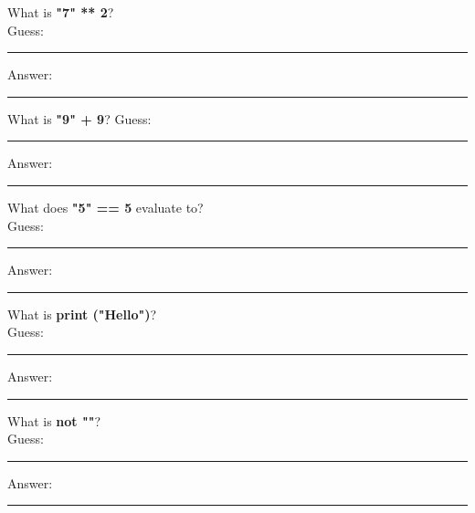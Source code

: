 \documentclass{article}
\begin{document}
\begin{tasks}[
    style=enumerate,
    label-format=\bfseries,
    label-width=1.5em,
    item-indent=2em,
    column-sep=1em,
    after-item-skip=2em
  ]
        \task What is \textbf{"7" ** 2}?  \\
        Guess:  \vspace{3mm}\\
        \rule{\linewidth}{0.4pt} %
        Answer:  \vspace{3mm}\\
        \rule{\linewidth}{0.4pt} %


        \task What is \textbf{"9" + 9}? 
        Guess:  \vspace{3mm}\\
        \rule{\linewidth}{0.4pt} %
        Answer:  \vspace{3mm}\\
        \rule{\linewidth}{0.4pt} %

        \task What does \textbf{"5" == 5} evaluate to?  \\
        Guess:  \vspace{3mm}\\
        \rule{\linewidth}{0.4pt} %
        Answer:  \vspace{3mm}\\
        \rule{\linewidth}{0.4pt} %

        \task What is \textbf{print ("Hello")}?   \\
        Guess:  \vspace{3mm}\\
        \rule{\linewidth}{0.4pt} %
        Answer:  \vspace{3mm}\\
        \rule{\linewidth}{0.4pt} %

        \task What is \textbf{not ""}?  \\
        Guess:  \vspace{3mm}\\
        \rule{\linewidth}{0.4pt} %
        Answer:  \vspace{3mm}\\
        \rule{\linewidth}{0.4pt} %


\end{tasks}
\end{document}
